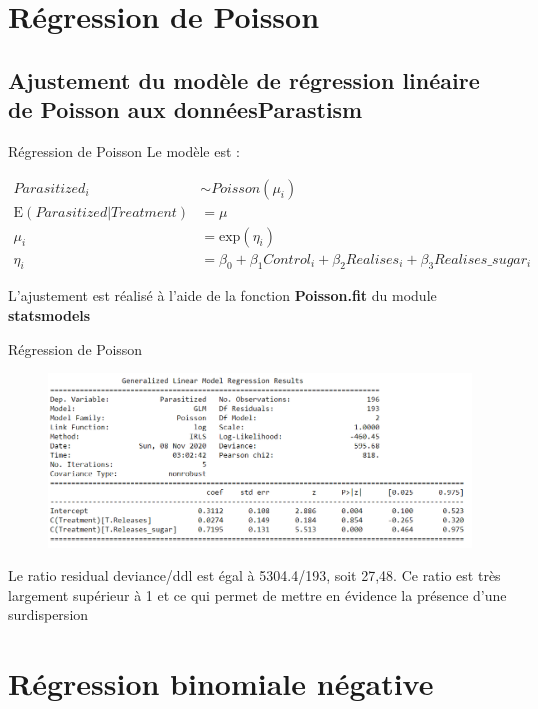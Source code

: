\documentclass[aspectratio=1610]{beamer}
\begin{document}
\section{Régression de Poisson}
\subsection{Ajustement du modèle de régression linéaire de Poisson aux donnéesParastism}
\begin{frame}{Régression de Poisson}
Le modèle est : 

\begin{align*}
Parasitized_i &\sim Poisson(\mu_i)\\
\mathrm{E}({Parasitized|Treatment}) &= \mu\\
\mu_i &= \mathrm{exp}(\eta_i)\\
\eta_i &= \beta_0 + \beta_1 Control_i + \beta_2 Realises_i + \beta_3 Realises\_sugar_i
\end{align*}



L’ajustement est réalisé à l’aide de la fonction \textbf{Poisson.fit} du module \textbf{statsmodels} 
\end{frame}


\begin{frame}{Régression de Poisson}
\begin{figure}[h]
\centering
 \includegraphics[width=.8\textwidth]{poisson.fit.png}

 \end{figure}
Le ratio residual deviance/ddl est égal à 5304.4/193, soit 27,48. Ce ratio est très largement supérieur à 1 et ce qui permet de mettre en évidence la présence d’une surdispersion
\end{frame}



\section{Régression binomiale négative}
\end{document}
